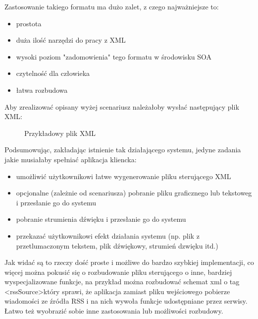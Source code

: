Zastosowanie takiego formatu ma dużo zalet, z czego najważniejsze to:
\begin{itemize}
	\item prostota
	\item duża ilość narzędzi do pracy z XML
	\item wysoki poziom "zadomowienia" tego formatu w środowisku SOA
	\item czytelność dla człowieka
	\item łatwa rozbudowa
\end{itemize}
Aby zrealizować opisany wyżej scenariusz należałoby wysłać następujący plik XML:

\setlength\fboxsep{20pt}
\setlength\fboxrule{1pt}
\begin{figure}[!h]
	\centering
	\caption{Przykładowy plik XML}
\end{figure}

Podsumowując, zakładając istnienie tak działającego systemu, jedyne zadania jakie musiałaby spełniać aplikacja kliencka:
\begin{itemize}
	\item umożliwić użytkownikowi łatwe wygenerowanie pliku sterującego XML
	\item opcjonalne (zależnie od scenariusza) pobranie pliku graficznego lub tekstoweg i przesłanie go do systemu
	\item pobranie strumienia dźwięku i przesłanie go do systemu
	\item przekazać użytkownikowi efekt działania systemu (np. plik z przetlumaczonym tekstem, plik dźwiękowy, strumień dzwięku itd.)
\end{itemize}
Jak widać są to rzeczy dość proste i możliwe do bardzo szybkiej implementacji, co więcej można pokusić się o rozbudowanie pliku sterującego o inne, bardziej wyspecjalizowane funkcje, na przykład można rozbudować schemat xml o tag \textless rssSource\textgreater który sprawi, że aplikacja zamiast pliku wejściowego pobierze wiadomości ze źródła RSS i na nich wywoła funkcje udostępniane przez serwisy. Łatwo też wyobrazić sobie inne zastosowania lub możliwości rozbudowy. 
